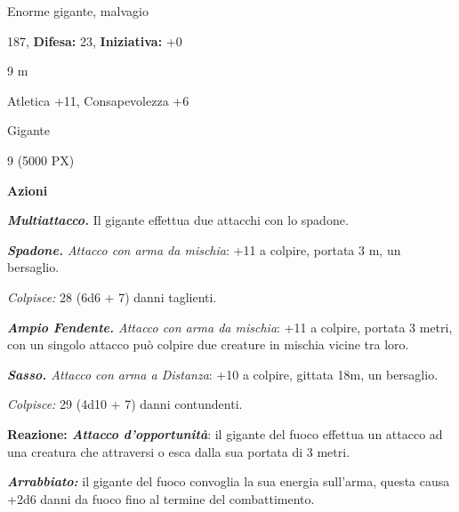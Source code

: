 \begin{multicols}{2}
{
\noindent
\begin{description}[noitemsep, topsep=0pt, parsep=0pt, partopsep=0pt, leftmargin=0cm, labelwidth=2.2cm]
	\item[\textbf{Taglia/Tipo:}] Enorme gigante, malvagio
	\item[\textbf{Caratt.:}] 
	\item[\textbf{Punti Ferita:}] 187,  \textbf{Difesa:} 23,  \textbf{Iniziativa:} +0
	\item[\textbf{Movimento:}] 9 m
	\item[\textbf{Tiri Salvez.:}] 
	\item[\textbf{Comp.:}] Atletica +11, Consapevolezza +6
	\item[\textbf{Linguaggi:}] Gigante
	\item[\textbf{Sfida:}] 9 (5000 PX)\smallskip
\end{description}

\textbf{Azioni}

\emph{\textbf{Multiattacco.}} Il gigante effettua due attacchi con lo spadone.

\emph{\textbf{Spadone.} Attacco con arma da mischia}: +11 a colpire, portata 3 m, un bersaglio.

\emph{Colpisce:} 28 (6d6 + 7) danni taglienti.

\emph{\textbf{Ampio Fendente.} Attacco con arma da mischia}: +11 a colpire, portata 3 metri, con un singolo attacco può colpire due creature in mischia vicine tra loro.

\emph{\textbf{Sasso.} Attacco con arma a Distanza}: +10 a colpire, gittata 18m, un bersaglio.

\emph{Colpisce:} 29 (4d10 + 7) danni contundenti.

\textbf{Reazione: \emph{Attacco d'opportunità}}: il gigante del fuoco effettua un attacco ad una creatura che attraversi o esca dalla sua portata di 3 metri.

\emph{\textbf{Arrabbiato:}} il gigante del fuoco convoglia la sua energia sull'arma, questa causa +2d6 danni da fuoco fino al termine del combattimento.

}
\end{multicols}
